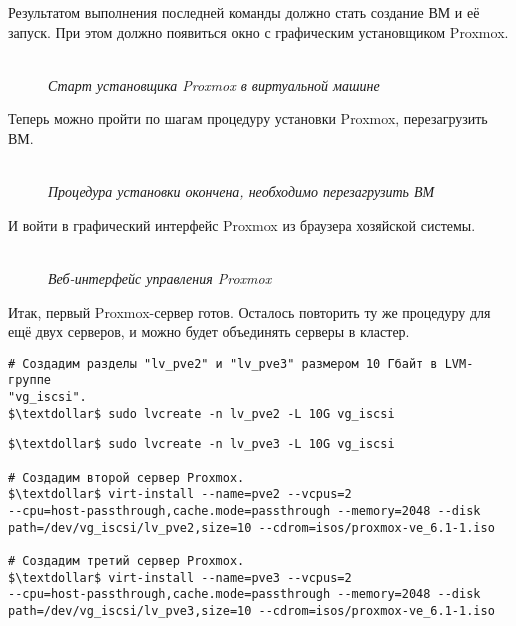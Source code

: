 \documentclass[14pt, a4paper]{article}
\begin{document}
Результатом выполнения последней команды должно стать создание ВМ и её запуск. При этом
должно появиться окно с графическим установщиком Proxmox.

\begin{figure}[h]
    \centering
    \\
    \small\textit{Старт установщика Proxmox в виртуальной машине}  
    \label{framework} 
\end{figure}

Теперь можно пройти по шагам процедуру установки Proxmox, перезагрузить ВМ.
\begin{figure}[h]
    \centering
    \\
    \small\textit{Процедура установки окончена, необходимо перезагрузить ВМ}  
    \label{framework} 
\end{figure}

И войти в графический интерфейс Proxmox из браузера хозяйской системы.

\begin{figure}[h]
    \centering
    \\
    \small\textit{Веб-интерфейс управления Proxmox}  
    \label{framework} 
\end{figure}

Итак, первый Proxmox-сервер готов. Осталось повторить ту же процедуру для ещё двух серверов, и
можно будет объединять серверы в кластер.
\vspace{0.15cm}
\begin{lstlisting}
# Создадим разделы "lv_pve2" и "lv_pve3" размером 10 Гбайт в LVM-группе
"vg_iscsi".
$\textdollar$ sudo lvcreate -n lv_pve2 -L 10G vg_iscsi
\end{lstlisting}
\newpage
\begin{lstlisting}
$\textdollar$ sudo lvcreate -n lv_pve3 -L 10G vg_iscsi
   
# Создадим второй сервер Proxmox.
$\textdollar$ virt-install --name=pve2 --vcpus=2
--cpu=host-passthrough,cache.mode=passthrough --memory=2048 --disk
path=/dev/vg_iscsi/lv_pve2,size=10 --cdrom=isos/proxmox-ve_6.1-1.iso

# Создадим третий сервер Proxmox.
$\textdollar$ virt-install --name=pve3 --vcpus=2
--cpu=host-passthrough,cache.mode=passthrough --memory=2048 --disk
path=/dev/vg_iscsi/lv_pve3,size=10 --cdrom=isos/proxmox-ve_6.1-1.iso
\end{lstlisting}
\vspace{0.2cm}
\end{document}
